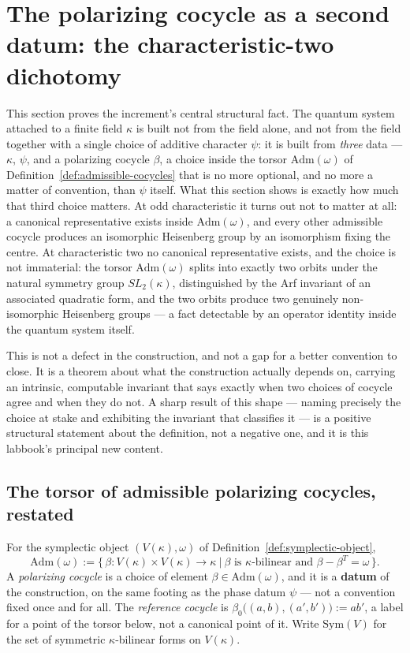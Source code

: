 \section{The polarizing cocycle as a second datum: the characteristic-two dichotomy}
\label{sec:polarizing-cocycle}

This section proves the increment's central structural fact. The quantum
system attached to a finite field $\kappa$ is built not from the field alone,
and not from the field together with a single choice of additive character
$\psi$: it is built from \emph{three} data — $\kappa$, $\psi$, and a
polarizing cocycle $\beta$, a choice inside the torsor
$\mathrm{Adm}(\omega)$ of Definition~\ref{def:admissible-cocycles} that is no
more optional, and no more a matter of convention, than $\psi$ itself. What
this section shows is exactly how much that third choice matters. At odd
characteristic it turns out not to matter at all: a canonical representative
exists inside $\mathrm{Adm}(\omega)$, and every other admissible cocycle
produces an isomorphic Heisenberg group by an isomorphism fixing the centre.
At characteristic two no canonical representative exists, and the choice is
not immaterial: the torsor $\mathrm{Adm}(\omega)$ splits into exactly two
orbits under the natural symmetry group $SL_2(\kappa)$, distinguished by the
Arf invariant of an associated quadratic form, and the two orbits produce two
genuinely non-isomorphic Heisenberg groups — a fact detectable by an operator
identity inside the quantum system itself.

This is not a defect in the construction, and not a gap for a better
convention to close. It is a theorem about what the construction actually
depends on, carrying an intrinsic, computable invariant that says exactly
when two choices of cocycle agree and when they do not. A sharp result of
this shape — naming precisely the choice at stake and exhibiting the
invariant that classifies it — is a positive structural statement about the
definition, not a negative one, and it is this labbook's principal new
content.

\subsection{The torsor of admissible polarizing cocycles, restated}

\begin{definition}
\label{def:admissible-cocycles-restated}
For the symplectic object $(V(\kappa),\omega)$ of
Definition~\ref{def:symplectic-object},
\[
\mathrm{Adm}(\omega) := \big\{\, \beta : V(\kappa)\times V(\kappa) \to \kappa
\ \big|\ \beta \text{ is $\kappa$-bilinear and } \beta - \beta^T = \omega
\,\big\}.
\]
A \emph{polarizing cocycle} is a choice of element $\beta\in\mathrm{Adm}(\omega)$,
and it is a \textbf{datum} of the construction, on the same footing as the
phase datum $\psi$ — not a convention fixed once and for all. The
\emph{reference cocycle} is $\beta_0\big((a,b),(a',b')\big):=ab'$, a label
for a point of the torsor below, not a canonical point of it. Write
$\mathrm{Sym}(V)$ for the set of symmetric $\kappa$-bilinear forms on
$V(\kappa)$.
\end{definition}

